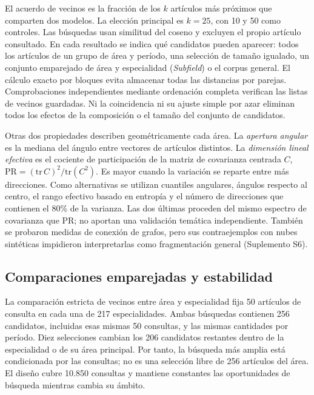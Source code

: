 \documentclass[12pt]{article}
\begin{document}
El acuerdo de vecinos es la fracción de los $k$ artículos más próximos que comparten dos modelos. La elección principal es $k=25$, con 10 y 50 como controles. Las búsquedas usan similitud del coseno y excluyen el propio artículo consultado. En cada resultado se indica qué candidatos pueden aparecer: todos los artículos de un grupo de área y período, una selección de tamaño igualado, un conjunto emparejado de área y especialidad (\emph{Subfield}) o el corpus general. El cálculo exacto por bloques evita almacenar todas las distancias por parejas. Comprobaciones independientes mediante ordenación completa verifican las listas de vecinos guardadas. Ni la coincidencia ni su ajuste simple por azar eliminan todos los efectos de la composición o el tamaño del conjunto de candidatos.

Otras dos propiedades describen geométricamente cada área. La \emph{apertura angular} es la mediana del ángulo entre vectores de artículos distintos. La \emph{dimensión lineal efectiva} es el cociente de participación de la matriz de covarianza centrada $C$, $\mathrm{PR}=(\mathrm{tr}\,C)^2/\mathrm{tr}(C^2)$. Es mayor cuando la variación se reparte entre más direcciones. Como alternativas se utilizan cuantiles angulares, ángulos respecto al centro, el rango efectivo basado en entropía y el número de direcciones que contienen el 80\% de la varianza. Las dos últimas proceden del mismo espectro de covarianza que PR; no aportan una validación temática independiente. También se probaron medidas de conexión de grafos, pero sus contraejemplos con nubes sintéticas impidieron interpretarlas como fragmentación general (Suplemento S6).

\subsection{Comparaciones emparejadas y estabilidad}
La comparación estricta de vecinos entre área y especialidad fija 50 artículos de consulta en cada una de 217 especialidades. Ambas búsquedas contienen 256 candidatos, incluidas esas mismas 50 consultas, y las mismas cantidades por período. Diez selecciones cambian los 206 candidatos restantes dentro de la especialidad o de su área principal. Por tanto, la búsqueda más amplia está condicionada por las consultas; no es una selección libre de 256 artículos del área. El diseño cubre 10.850 consultas y mantiene constantes las oportunidades de búsqueda mientras cambia su ámbito.
\end{document}
